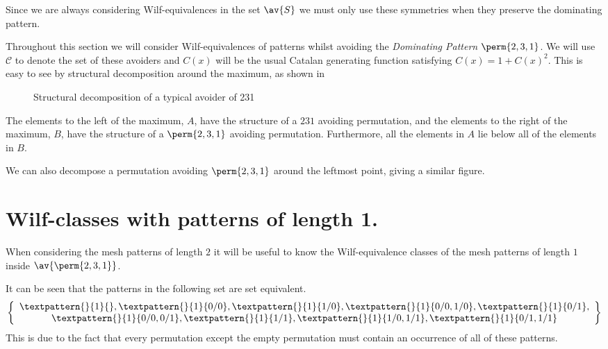 Since we are always considering Wilf-equivalences in the set \(\av{S}\) we
must only use these symmetries when they preserve the dominating pattern.

Throughout this section we will consider Wilf-equivalences of patterns
whilst avoiding the \emph{Dominating Pattern} \(\perm{2,3,1}\). We will
use \(\mathcal{C}\) to denote the set of these avoiders and \(C(x)\) will
be the usual Catalan generating function satisfying \(C(x) = 1 + C(x)^2\).
This is easy to see by structural decomposition around the maximum, as
shown in 

\begin{figure}[!ht]
    \centering
    \caption{Structural decomposition of a typical avoider of 231}
    \label{fig:decompmax}
\end{figure}

The elements to the left of the maximum, \(A\), have the structure of a \(231\)
avoiding permutation, and the elements to the right of the maximum, \(B\), have the
structure of a \(\perm{2,3,1}\) avoiding permutation. Furthermore, all the
elements in \(A\) lie below all of the elements in \(B\).

We can also decompose a permutation avoiding \(\perm{2,3,1}\) around the leftmost
point, giving a similar figure.

\section{Wilf-classes with patterns of length 1.}
When considering the mesh patterns of length \(2\) it will be useful to know
the Wilf-equivalence classes of the mesh patterns of length \(1\) inside
\(\av{\perm{2,3,1}}\).

It can be seen that the patterns in the following set are set equivalent.
\begin{equation*}
    \left\{
        \begin{array}{c}
        \textpattern{}{1}{},
        \textpattern{}{1}{0/0},
        \textpattern{}{1}{1/0},
        \textpattern{}{1}{0/0,1/0},
        \textpattern{}{1}{0/1},\\
        \textpattern{}{1}{0/0,0/1},
        \textpattern{}{1}{1/1},
        \textpattern{}{1}{1/0,1/1},
        \textpattern{}{1}{0/1,1/1}
    \end{array}
    \right\}
\end{equation*}
This is due to the fact that every permutation except the empty
permutation must contain an occurrence of all of these patterns.

